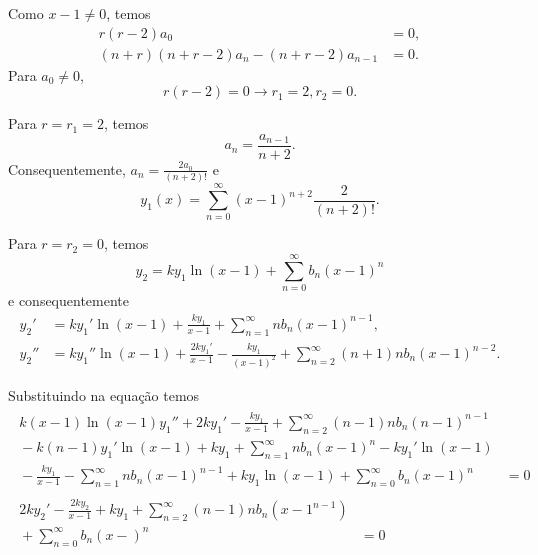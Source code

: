 \documentclass[a4paper,12pt, leqno, answers]{exam}
\begin{document}
\begin{questions}
\begin{solution}
        Como $x - 1 \neq 0$, temos
        \begin{align*}
            r \left( r - 2 \right) a_0 &= 0, \\
            \left( n + r \right) \left( n + r - 2 \right) a_n - \left( n + r - 2 \right) a_{n - 1} &= 0.
        \end{align*}
        Para $a_0 \neq 0$,
        \[
        r \left( r - 2 \right) = 0 \rightarrow r_1 = 2, r_2 = 0.
        \]

        Para $r = r_1 = 2$, temos
        \[
        a_n = \frac{a_{n - 1}}{n + 2}.
        \]
        Consequentemente, $a_n = \frac{2 a_0}{\left( n + 2 \right)!}$ e
        \[
        y_1(x) = \sum_{n = 0}^\infty \left( x - 1 \right)^{n + 2} \frac{2}{\left( n + 2 \right)!}.
        \]

        Para $r = r_2 = 0$, temos
        \[
        y_2 = k y_1 \ln \left( x - 1 \right) + \sum_{n = 0}^\infty b_n \left( x - 1 \right)^n
        \]
        e consequentemente
        \begin{align*}
            y_2' &= k y_1' \ln \left( x - 1 \right) + \frac{k y_1}{x - 1} + \sum_{n = 1}^\infty n b_n \left( x - 1 \right)^{n - 1}, \\
            y_2'' &= k y_1 '' \ln \left( x - 1 \right) + \frac{2 k y_1'}{x - 1} - \frac{k y_1}{\left( x - 1 \right)^2} + \sum_{n = 2}^\infty \left( n + 1 \right) n b_n \left( x - 1 \right)^{n - 2}.
        \end{align*}

        Substituindo na equa\c{c}\~{a}o temos
        \begin{align*}
            \begin{split}
                k \left( x - 1 \right) \ln \left( x - 1 \right) y_1'' + 2 k y_1' - \frac{k y_1}{x - 1} + \sum_{n = 2}^\infty \left( n - 1 \right) n b_n \left( n - 1 \right)^{n - 1} \\ {}- k \left( n - 1 \right) y_1' \ln \left(  x - 1 \right) + k y_1 + \sum_{n = 1}^\infty n b_n \left( x - 1 \right)^n - k y_1' \ln \left( x - 1 \right) \\ {}- \frac{k y_1}{x - 1} - \sum_{n = 1}^\infty n b_n \left( x - 1 \right)^{n - 1} + k y_1 \ln \left( x - 1 \right) + \sum_{n = 0}^\infty b_n \left( x - 1 \right)^n &= 0
            \end{split} \\
            \begin{split}
                2 k y_2' - \frac{2 k y_2}{x - 1} + k y_1 + \sum_{n = 2}^\infty \left( n - 1 \right) n b_n \left( x - 1^{n - 1} \right) \\ {}+ \sum_{n = 0}^\infty b_n \left( x -  \right)^n &= 0
            \end{split}
        \end{align*}


\end{solution}
\end{questions}
\end{document}
